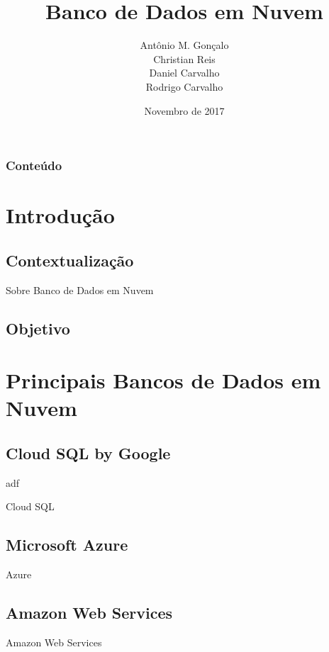 \documentclass[11pt]{beamer}
\author{Antônio M. Gonçalo \\ Christian Reis \\ Daniel Carvalho \\ Rodrigo Carvalho\\ }
\title[Banco de Dados em Nuvem]{Banco de Dados em Nuvem}
\date{Novembro de 2017}
\begin{document}
\begin{frame}
\titlepage
\end{frame}

\begin{frame}
\frametitle{Conteúdo} 
\tableofcontents
\end{frame}

\section{Introdução}
\subsection{Contextualização}
\begin{frame}{Sobre Banco de Dados em Nuvem}
\end{frame}

\subsection{Objetivo}

\section{Principais Bancos de Dados em Nuvem}
\subsection{Cloud SQL by Google}
adf
\begin{frame}{Cloud SQL}

\end{frame}

\subsection{Microsoft Azure}

\begin{frame}{Azure}

\end{frame}

\subsection{Amazon Web Services}

\begin{frame}{Amazon Web Services}

\end{frame}
\end{document}
